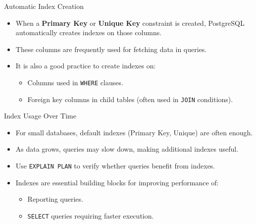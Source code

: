 \documentclass[aspectratio=169]{beamer}
\begin{document}

\begin{frame}{Automatic Index Creation}
  \begin{itemize}
    \item When a \textbf{Primary Key} or \textbf{Unique Key} constraint is created, PostgreSQL automatically creates indexes on those columns.
    \item These columns are frequently used for fetching data in queries.
    \item It is also a good practice to create indexes on:
      \begin{itemize}
        \item Columns used in \texttt{WHERE} clauses.
        \item Foreign key columns in child tables (often used in \texttt{JOIN} conditions).
      \end{itemize}
  \end{itemize}
\end{frame}

\begin{frame}{Index Usage Over Time}
  \begin{itemize}
    \item For small databases, default indexes (Primary Key, Unique) are often enough.
    \item As data grows, queries may slow down, making additional indexes useful.
    \item Use \texttt{EXPLAIN PLAN} to verify whether queries benefit from indexes.
    \item Indexes are essential building blocks for improving performance of:
      \begin{itemize}
        \item Reporting queries.
        \item \texttt{SELECT} queries requiring faster execution.
      \end{itemize}
  \end{itemize}
\end{frame}
\end{document}
